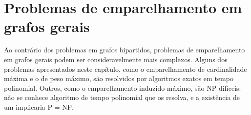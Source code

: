 \chapter{Problemas de emparelhamento em grafos gerais}
\label{cap:gerais}

Ao contrário dos problemas em grafos bipartidos, problemas de emparelhamento em grafos gerais podem ser consideravelmente mais complexos. Alguns dos problemas apresentados neste capítulo, como o emparelhamento de cardinalidade máxima e o de peso máximo, são resolvidos por algoritmos exatos em tempo polinomial. Outros, como o emparelhamento induzido máximo, são NP-difíceis: não se conhece algoritmo de tempo polinomial que os resolva, e a existência de um implicaria P = NP.




